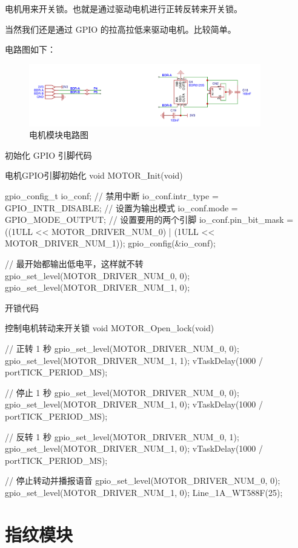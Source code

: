 \documentclass[lang=cn,newtx,10pt,scheme=chinese]{elegantbook}
\begin{document}
电机用来开关锁。也就是通过驱动电机进行正转反转来开关锁。

当然我们还是通过 GPIO 的拉高拉低来驱动电机。比较简单。

电路图如下：

\begin{figure}[!htb]
\centering
\includegraphics[width=0.9\textwidth]{motor.png}
\caption{电机模块电路图}
\end{figure}

初始化 GPIO 引脚代码

\begin{mycode}{电机GPIO引脚初始化}
void MOTOR_Init(void)
{
    gpio_config_t io_conf;
    // 禁用中断
    io_conf.intr_type = GPIO_INTR_DISABLE;
    // 设置为输出模式
    io_conf.mode = GPIO_MODE_OUTPUT;
    // 设置要用的两个引脚
    io_conf.pin_bit_mask = ((1ULL << MOTOR_DRIVER_NUM_0) | (1ULL << MOTOR_DRIVER_NUM_1));
    gpio_config(&io_conf);

    // 最开始都输出低电平，这样就不转
    gpio_set_level(MOTOR_DRIVER_NUM_0, 0);
    gpio_set_level(MOTOR_DRIVER_NUM_1, 0);
}
\end{mycode}

开锁代码

\begin{mycode}{控制电机转动来开关锁}
void MOTOR_Open_lock(void)
{
    // 正转 1 秒
    gpio_set_level(MOTOR_DRIVER_NUM_0, 0);
    gpio_set_level(MOTOR_DRIVER_NUM_1, 1);
    vTaskDelay(1000 / portTICK_PERIOD_MS);

    // 停止 1 秒
    gpio_set_level(MOTOR_DRIVER_NUM_0, 0);
    gpio_set_level(MOTOR_DRIVER_NUM_1, 0);
    vTaskDelay(1000 / portTICK_PERIOD_MS);

    // 反转 1 秒
    gpio_set_level(MOTOR_DRIVER_NUM_0, 1);
    gpio_set_level(MOTOR_DRIVER_NUM_1, 0);
    vTaskDelay(1000 / portTICK_PERIOD_MS);

    // 停止转动并播报语音
    gpio_set_level(MOTOR_DRIVER_NUM_0, 0);
    gpio_set_level(MOTOR_DRIVER_NUM_1, 0);
    Line_1A_WT588F(25);
}
\end{mycode}

\chapter{指纹模块}
\end{document}
